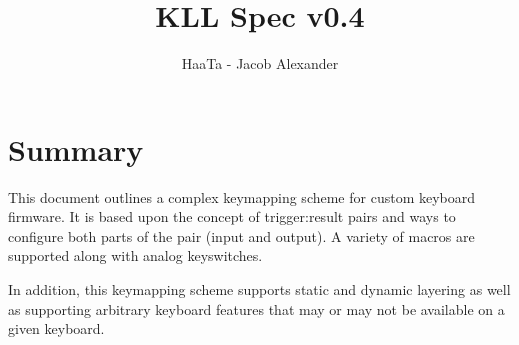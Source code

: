 \documentclass{kiibohd-template}
\begin{document}


\title{KLL Spec v0.4}
\author{HaaTa - Jacob Alexander}

\maketitle


\begin{versionhistory}
\end{versionhistory}

\printtables

\chapter{Summary}

This document outlines a complex keymapping scheme for custom keyboard firmware.
It is based upon the concept of trigger:result pairs and ways to configure both parts of the pair (input and output).
A variety of macros are supported along with analog keyswitches.

In addition, this keymapping scheme supports static and dynamic layering as well as supporting arbitrary keyboard features that may or may not be available on a given keyboard.
\end{document}
